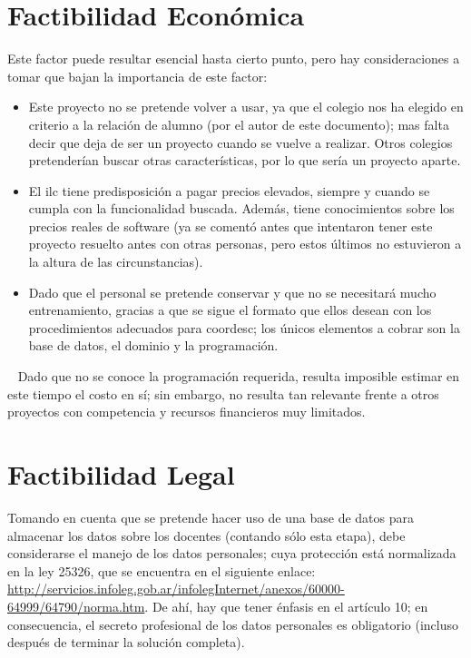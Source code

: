 \section{Factibilidad Económica}
\normalsize{ \indent
Este factor puede resultar esencial hasta cierto punto,
pero hay consideraciones a tomar que bajan la importancia
de este factor:
}
\begin{itemize}
  \item Este proyecto no se pretende volver a usar, ya que
  el colegio nos ha elegido en criterio a la relación de 
  alumno (por el autor de este documento); mas falta decir
  que deja de ser un proyecto cuando se vuelve a realizar.
  Otros colegios pretenderían buscar otras características,
  por lo que sería un proyecto aparte.
  \item El \acrlong{ilc} tiene predisposición a pagar precios
  elevados, siempre y cuando se cumpla con la funcionalidad
  buscada. Además, tiene conocimientos sobre los precios
  reales de software (ya se comentó antes que intentaron
  tener este proyecto resuelto antes con otras personas, pero
  estos últimos no estuvieron a la altura de las
  circunstancias).
  \item Dado que el personal se pretende conservar y que no
  se necesitará mucho entrenamiento, gracias a que se sigue
  el formato que ellos desean con los procedimientos
  adecuados para \Gls{coordesc}; los únicos elementos
  a cobrar son la base de datos, el dominio y la programación.
\end{itemize}
\ \newline
\normalsize{ \indent
Dado que no se conoce la programación requerida, resulta
imposible estimar en este tiempo el costo en sí; sin embargo,
no resulta tan relevante frente a otros proyectos con
competencia y recursos financieros muy limitados.
}
\section{Factibilidad Legal}
\normalsize{ \indent
Tomando en cuenta que se pretende hacer uso de una base de
datos para almacenar los datos sobre los docentes (contando
sólo esta etapa), debe considerarse el manejo de los datos
personales; cuya protección está normalizada en la ley 25326,
que se encuentra en el siguiente enlace:
\url{http://servicios.infoleg.gob.ar/infolegInternet/anexos/60000-64999/64790/norma.htm}.
}
\newline
\normalsize{ \indent
De ahí, hay que tener énfasis en el artículo 10; en
consecuencia, el secreto profesional de los datos personales
es obligatorio (incluso después de terminar la solución
completa).
}

